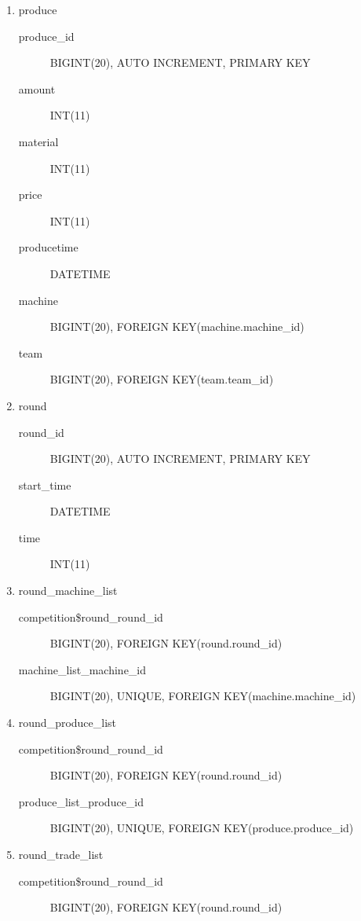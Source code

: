 \documentclass{article}
\begin{document}
{\begin{enumerate}
\begin{description}
      \item[machine\_id] BIGINT(20), AUTO INCREMENT, PRIMARY KEY, FOREIGN KEY(machine.machine\_id)
      \item[trade\_list\_trade\_id] BIGINT(20), UNIQUE, FOREIGN KEY(trade.trade\_id)
    \end{description}
  \item produce
    \begin{description}
      \item[produce\_id] BIGINT(20), AUTO INCREMENT, PRIMARY KEY
      \item[amount] INT(11)
      \item[material] INT(11)
      \item[price] INT(11)
      \item[producetime] DATETIME
      \item[machine] BIGINT(20), FOREIGN KEY(machine.machine\_id)
      \item[team] BIGINT(20), FOREIGN KEY(team.team\_id)
    \end{description}
  \item round
    \begin{description}
      \item[round\_id] BIGINT(20), AUTO INCREMENT, PRIMARY KEY
      \item[start\_time] DATETIME
      \item[time] INT(11)
    \end{description}
  \item round\_machine\_list
    \begin{description}
      \item[competition\$round\_round\_id] BIGINT(20), FOREIGN KEY(round.round\_id)
      \item[machine\_list\_machine\_id] BIGINT(20), UNIQUE, FOREIGN KEY(machine.machine\_id)
    \end{description}
  \item round\_produce\_list
    \begin{description}
      \item[competition\$round\_round\_id] BIGINT(20), FOREIGN KEY(round.round\_id)
      \item[produce\_list\_produce\_id] BIGINT(20), UNIQUE, FOREIGN KEY(produce.produce\_id)
    \end{description}
  \item round\_trade\_list
    \begin{description}
      \item[competition\$round\_round\_id] BIGINT(20), FOREIGN KEY(round.round\_id)

\end{description}
\end{enumerate}}
\end{document}
